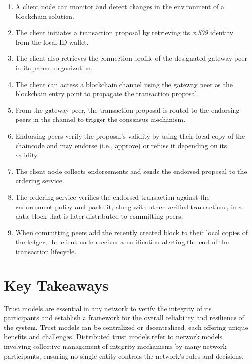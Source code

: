 \documentclass[conference]{IEEEtran}
\begin{document}
\begin{enumerate}
    \item A client node can monitor and detect changes in the environment of a blockchain solution.   
    \item The client initiates a transaction proposal by retrieving its \textit{x.509} identity from the local ID wallet.
    \item The client also retrieves the connection profile of the designated gateway peer in its parent organization. 
    \item The client can access a blockchain channel using the gateway peer as the blockchain entry point to propagate the transaction proposal. 
    \item From the gateway peer, the transaction proposal is routed to the endorsing peers in the channel to trigger the consensus mechanism.
    \item Endorsing peers verify the proposal's validity by using their local copy of the chaincode and may endorse (i.e., approve) or refuse it depending on its validity. 
    \item The client node collects endorsements and sends the endorsed proposal to the ordering service. 
    \item The ordering service verifies the endorsed transaction against the endorsement policy and packs it, along with other verified transactions, in a data block that is later distributed to committing peers. 
    \item When committing peers add the recently created block to their local copies of the ledger, the client node receives a notification alerting the end of the transaction lifecycle.
\end{enumerate}
\section{Key Takeaways}
Trust models are essential in any network to verify the integrity of its participants and establish a framework for the overall reliability and resilience of the system. Trust models can be centralized or decentralized, each offering unique benefits and challenges. Distributed trust models refer to network models involving collective management of integrity mechanisms by many network participants, ensuring no single entity controls the network's rules and decisions. \\
\end{document}
